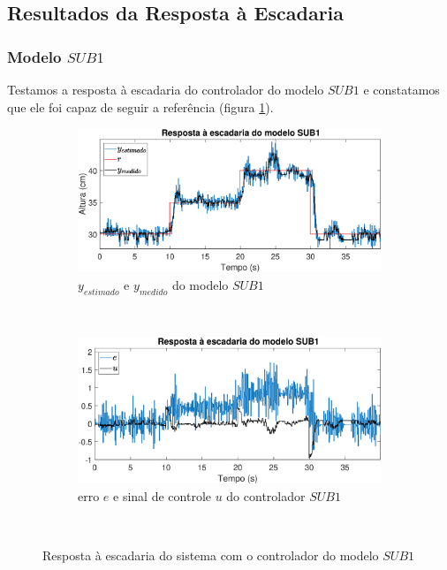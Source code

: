 \subsection{Resultados da Resposta à Escadaria}\label{rstair}

\subsubsection{Modelo $SUB1$}
Testamos a resposta à escadaria do controlador do modelo $SUB1$ e constatamos que ele foi capaz de seguir a referência (figura \ref{fig:stairrsub1y}).

\begin{figure}[htb]
	\centering
	\begin{subfigure}[t]{0.48\textwidth}
		\includegraphics[width=1\linewidth]{stairrsub1y}
		\caption[$y_{estimado}$ e $y_{medido}$ do modelo $SUB1$]{$y_{estimado}$ e $y_{medido}$ do modelo $SUB1$}
		\label{fig:stairrsub1y}
	\end{subfigure}
	~ %
	\begin{subfigure}[t]{0.48\textwidth}
		\includegraphics[width=1\linewidth]{stairrsub1e}
		\caption[erro $e$ e sinal de controle $u$ do controlador $SUB1$]{erro $e$ e sinal de controle $u$ do controlador $SUB1$}
		\label{fig:stairrsub1e}
	\end{subfigure}
	~ %
	
	\caption{Resposta à escadaria do sistema com o controlador do modelo $SUB1$}\label{fig:stairrsub1}
\end{figure}

